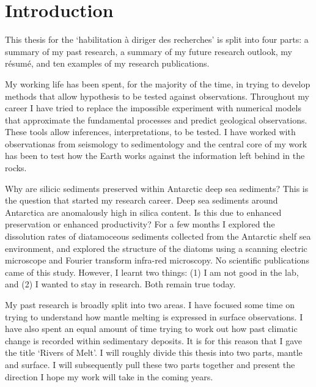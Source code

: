 \chapter{Introduction}

This thesis for the `habilitation à diriger des recherches' is split into four parts: a summary of my past research, a summary of my future research outlook, my résumé, and ten examples of my research publications.

My working life has been spent, for the majority of the time, in trying to develop methods that allow hypothesis to be tested against observations. Throughout my career I have tried to replace the impossible experiment with numerical models that approximate the fundamental processes and predict geological observations. These tools allow inferences, interpretations, to be tested. I have worked with observationas from seismology to sedimentology and the central core of my work has been to test how the Earth works against the information left behind in the rocks.

Why are silicic sediments preserved within Antarctic deep sea sediments? This is the question that started my research career. Deep sea sediments around Antarctica are anomalously high in silica content. Is this due to enhanced preservation or enhanced productivity? For a few months I explored the dissolution rates of diatamoceous sediments collected from the Antarctic shelf sea environment, and explored the structure of the diatoms using a scanning electric microscope and Fourier transform infra-red microscopy. No scientific publications came of this study. However, I learnt two things: (1) I am not good in the lab, and (2) I wanted to stay in research. Both remain true today.

My past research is broadly split into two areas. I have focused some time on trying to understand how mantle melting is expressed in surface observations. I have also spent an equal amount of time trying to work out how past climatic change is recorded within sedimentary deposits. It is for this reason that I gave the title `Rivers of Melt'. I will roughly divide this thesis into two parts, mantle and surface. I will subsequently pull these two parts together and present the direction I hope my work will take in the coming years.
